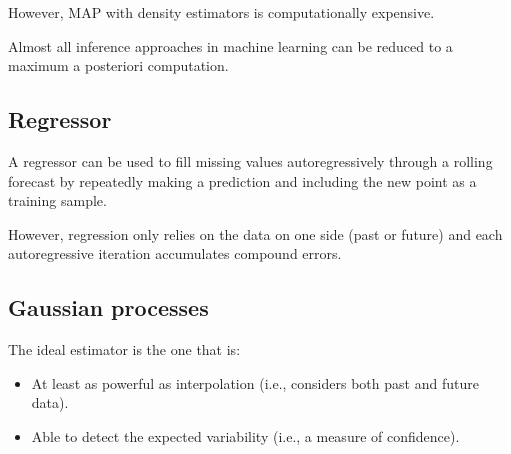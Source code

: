 However, MAP with density estimators is computationally expensive.

\begin{remark}
    Almost all inference approaches in machine learning can be reduced to a maximum a posteriori computation.
\end{remark}


\subsection{Regressor}

A regressor can be used to fill missing values autoregressively through a rolling forecast by repeatedly making a prediction and including the new point as a training sample.

However, regression only relies on the data on one side (past or future) and each autoregressive iteration accumulates compound errors.


\subsection{Gaussian processes}

\begin{remark}
    The ideal estimator is the one that is:
    \begin{itemize}
        \item At least as powerful as interpolation (i.e., considers both past and future data).
        \item Able to detect the expected variability (i.e., a measure of confidence).
    \end{itemize}
\end{remark}

